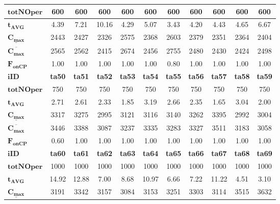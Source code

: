 \documentclass[printmode,oneside]{mgr}
\begin{document}
\begin{table}[!ht]
\begin{tabularx}{\textwidth}{|X|c|c|c|c|c|c|c|c|c|c|}
\hline
$\mathbf{totNOper}$ & 600 & 600 & 600 & 600 & 600 & 600 & 600 & 600 & 600 & 600\\
\hline
$\mathbf{t_{AVG}}$ & 4.39 & 7.21 & 10.16 & 4.29 & 5.07 & 3.43 & 4.20 & 4.43 & 4.65 & 6.67\\
\hline
$\mathbf{\underline{C_{max}}}$ & 2443 & 2427 & 2326 & 2575 & 2368 & 2603 & 2379 & 2351 & 2364 & 2404\\
\hline
$\mathbf{\overline{C_{max}}}$ & 2565 & 2562 & 2415 & 2674 & 2456 & 2755 & 2480 & 2430 & 2424 & 2498\\
\hline
$\mathbf{F_{onCP}}$ & 1.00 & 1.00 & 1.00 & 1.00 & 1.00 & 0.80 & 1.00 & 1.00 & 1.00 & 1.00\\
\hline
\hline
$\mathbf{iID}$ & \textbf{ta50} & \textbf{ta51} & \textbf{ta52} & \textbf{ta53} & \textbf{ta54} & \textbf{ta55} & \textbf{ta56} & \textbf{ta57} & \textbf{ta58} & \textbf{ta59}\\
\hline
$\mathbf{totNOper}$ & 750 & 750 & 750 & 750 & 750 & 750 & 750 & 750 & 750 & 750\\
\hline
$\mathbf{t_{AVG}}$ & 2.71 & 2.61 & 2.33 & 1.85 & 3.19 & 2.66 & 2.35 & 1.65 & 3.04 & 2.00\\
\hline
$\mathbf{\underline{C_{max}}}$ & 3317 & 3275 & 2995 & 3121 & 3116 & 3140 & 3262 & 3395 & 2992 & 3004\\
\hline
$\mathbf{\overline{C_{max}}}$ & 3446 & 3388 & 3087 & 3237 & 3335 & 3283 & 3327 & 3511 & 3183 & 3058\\
\hline
$\mathbf{F_{onCP}}$ & 0.60 & 1.00 & 1.00 & 1.00 & 1.00 & 1.00 & 1.00 & 1.00 & 1.00 & 1.00\\
\hline
\hline
$\mathbf{iID}$ & \textbf{ta60} & \textbf{ta61} & \textbf{ta62} & \textbf{ta63} & \textbf{ta64} & \textbf{ta65} & \textbf{ta66} & \textbf{ta67} & \textbf{ta68} & \textbf{ta69}\\
\hline
$\mathbf{totNOper}$ & 1000 & 1000 & 1000 & 1000 & 1000 & 1000 & 1000 & 1000 & 1000 & 1000\\
\hline
$\mathbf{t_{AVG}}$ & 14.92 & 12.88 & 7.00 & 8.68 & 10.97 & 6.66 & 7.22 & 11.22 & 4.51 & 3.10\\
\hline
$\mathbf{\underline{C_{max}}}$ & 3191 & 3342 & 3157 & 3084 & 3153 & 3251 & 3303 & 3114 & 3515 & 3632\\

\end{tabularx}
\end{table}
\end{document}
